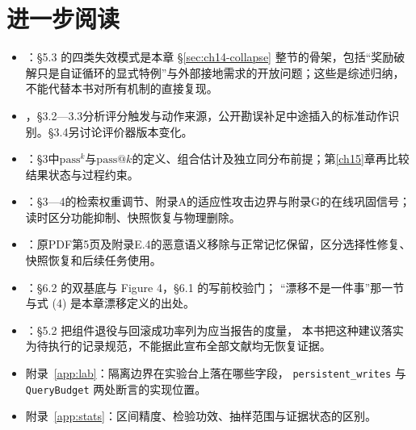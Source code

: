 \section*{进一步阅读}
\begin{itemize}
  \item \cite{rsi-survey-2607}：§5.3 的四类失效模式是本章 §\ref{sec:ch14-collapse}
        整节的骨架，包括“奖励破解只是自证循环的显式特例”与外部接地需求的开放问题；这些是综述归纳，不能代替本书对所有机制的直接复现。
  \item \cite{silent-instrument-2611}，§3.2—3.3分析评分触发与动作来源，公开勘误补足中途插入的标准动作识别。§3.4另讨论评价器版本变化。
  \item \cite{tau-bench-2406}：§3中$\mathrm{pass}^{k}$与$\mathrm{pass}@k$的定义、组合估计及独立同分布前提；第\ref{ch15}章再比较结果状态与过程约束。
  \item \cite{dream-2610}：§3—4的检索权重调节、附录A的适应性攻击边界与附录G的在线巩固信号；读时区分功能抑制、快照恢复与物理删除。
  \item \cite{memsecbench-2607}：原PDF第5页及附录E.4的恶意语义移除与正常记忆保留，区分选择性修复、快照恢复和后续任务使用。
  \item \cite{ssgm-2603}：§6.2 的双基底与 Figure 4，§6.1 的写前校验门；
        “漂移不是一件事”那一节与式 (4) 是本章漂移定义的出处。
  \item \cite{coding-survey-2608}：§5.2 把组件退役与回滚成功率列为应当报告的度量，
        本书把这种建议落实为待执行的记录规范，不能据此宣布全部文献均无恢复证据。
  \item 附录~\ref{app:lab}：隔离边界在实验台上落在哪些字段，
        \texttt{persistent\_writes} 与 \texttt{QueryBudget} 两处断言的实现位置。
  \item 附录~\ref{app:stats}：区间精度、检验功效、抽样范围与证据状态的区别。
\end{itemize}
